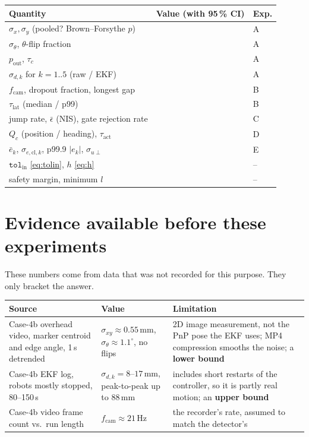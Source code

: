 \documentclass[11pt,a4paper]{article}
\begin{document}
\begin{center}
\small
\begin{tabularx}{\textwidth}{@{}l X l@{}}
\toprule
Quantity & Value (with 95\,\% CI) & Exp. \\
\midrule
$\sigma_x,\sigma_y$ (pooled? Brown--Forsythe $p$) & & A\\
$\sigma_\theta$, $\theta$-flip fraction & & A\\
$p_\text{out}$, $\tau_c$ & & A\\
$\sigma_{d,k}$ for $k=1..5$ (raw / EKF) & & A\\
$f_\text{cam}$, dropout fraction, longest gap & & B\\
$\tau_\text{lat}$ (median / p99) & & B\\
jump rate, $\bar\epsilon$ (NIS), gate rejection rate & & C\\
$Q_c$ (position / heading), $\tau_\text{act}$ & & D\\
$\bar e_k$, $\sigma_{e,\text{cl},k}$, p99.9 $|e_k|$, $\sigma_{u\perp}$ & & E\\
\midrule
$\texttt{tol}_\text{in}$ \eqref{eq:tolin}, $h$ \eqref{eq:h} & & --\\
safety margin, minimum $l$ & & --\\
\bottomrule
\end{tabularx}
\end{center}

\appendix
\section{Evidence available before these experiments}

These numbers come from data that was not recorded for this purpose. They
only bracket the answer.

\begin{center}
\small
\begin{tabularx}{\textwidth}{@{}X l X@{}}
\toprule
Source & Value & Limitation \\
\midrule
Case-4b overhead video, marker centroid and edge angle, 1\,s detrended
& $\sigma_{xy}\approx0.55$\,mm, $\sigma_\theta\approx1.1^\circ$, no flips
& 2D image measurement, not the PnP pose the EKF uses; MP4 compression smooths the noise; a \textbf{lower bound} \\
Case-4b EKF log, robots mostly stopped, 80--150\,s
& $\sigma_{d,k}=8$--$17$\,mm, peak-to-peak up to 88\,mm
& includes short restarts of the controller, so it is partly real motion; an \textbf{upper bound} \\
Case-4b video frame count vs.\ run length
& $f_\text{cam}\approx21$\,Hz
& the recorder's rate, assumed to match the detector's \\
\bottomrule
\end{tabularx}
\end{center}
\end{document}
